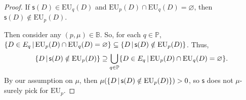 \documentclass[a4paper]{article}
\newtheorem{theorem}{Theorem}
\newtheorem{lemma}[theorem]{Lemma}
\renewcommand\P{\mathbb{P}} %
\newcommand\EU{\mathrm{EU}}
\newcommand\EAd{\mathrm{EAd}}
\newcommand{\Decs}{\mathcal{D}}
\newcommand\s{\mathsf{s}}
\newcommand{\IB}{\mathbb{B}}
\newcommand{\IP}{\P}
\renewcommand{\color}[1]{}
\newenvironment{colored}[1]{\leavevmode\color{#1}}{}
\newcommand\SetDelimiter[1][]{
	\nonscript\,#1\vert \allowbreak \nonscript\,\mathopen{}}
\providecommand\given{\SetDelimiter}
\renewcommand{\emptyset}{\varnothing}
\renewcommand{\geq}{\geqslant}
\newenvironment{CCM rewritten}
{\begingroup\color{blue}} %
{\endgroup}              %
\begin{document}
\begin{colored}{violet}
\begin{proof}
	
	If $\s(D)\in\EU_q(D)$ and $\EU_p(D)\cap\EU_q(D)=\emptyset$, then $\s(D)\notin\EU_p(D)$. 
	
	Then consider any $(p,\mu)\in\IB$. 
	So, for each $q\in\IP$, $\{D\in E_q\given \EU_p(D)\cap\EU_q(D)=\emptyset\}\subseteq\{D\given \s(D)\notin\EU_p(D)\}$. Thus, $$\{D\given \s(D)\notin\EU_p(D)\}\supseteq\bigcup_{q\in\IP}\{D\in E_q\given \EU_p(D)\cap\EU_q(D)=\emptyset\}.$$ By our assumption on $\mu$, then $\mu(\{D\given \s(D)\notin\EU_p(D)\})>0$, so $\s$ does not $\mu$-surely pick for $\EU_p$. 
\end{proof}

%	
%	
%	
%
%
%


\end{colored}
\end{document}
